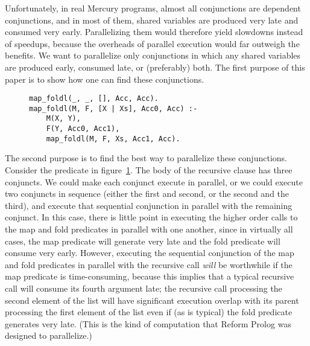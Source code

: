 Unfortunately, in real Mercury programs,
almost all conjunctions are dependent conjunctions,
and in most of them,
shared variables are produced very late and consumed very early.
Parallelizing them would therefore yield slowdowns instead of speedups,
because the overheads of parallel execution would far outweigh the benefits.
We want to parallelize only conjunctions
in which any shared variables are produced early, consumed late,
or (preferably) both.
The first purpose of this paper is to show how one can find these conjunctions.

\begin{figure}[b]
\begin{verbatim}
map_foldl(_, _, [], Acc, Acc).
map_foldl(M, F, [X | Xs], Acc0, Acc) :-
    M(X, Y),
    F(Y, Acc0, Acc1),
    map_foldl(M, F, Xs, Acc1, Acc).
\end{verbatim}
\caption{\mapfoldl}
\label{fig:map_foldl}
\end{figure}

The second purpose is to find the best way to parallelize these conjunctions.
Consider the \mapfoldl predicate in figure~\ref{fig:map_foldl}.
The body of the recursive clause has three conjuncts.
We could make each conjunct execute in parallel,
or we could execute two conjuncts in sequence
(either the first and second, or the second and the third),
and execute that sequential conjunction in parallel with the remaining conjunct.
In this case, there is little point in executing
the higher order calls to the map and fold predicates
in parallel with one another,
since in virtually all cases,
the map predicate will generate  very late and
the fold predicate will consume  very early.
However, executing the sequential conjunction of the map and fold predicates
in parallel with the recursive call \emph{will} be worthwhile
if the map predicate is time-consuming,
because this implies that
a typical recursive call will consume its fourth argument late;
the recursive call processing the second element of the list
will have significant execution overlap
with its parent processing the first element of the list
even if (as is typical) the fold predicate generates  very late.
(This is the kind of computation that
Reform Prolog \cite{bevemyr:reform} was designed to parallelize.)

